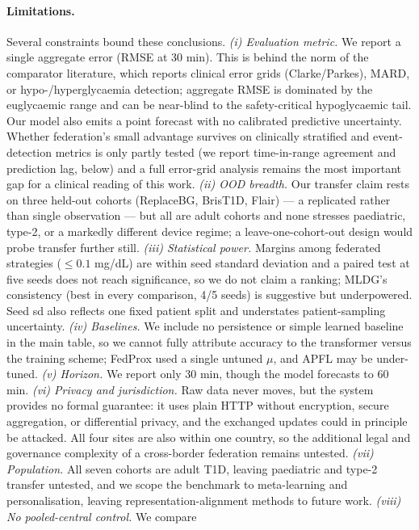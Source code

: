 \documentclass[10pt,letterpaper]{article}
\begin{document}
\paragraph{Limitations.} Several constraints bound these conclusions. \emph{(i)
Evaluation metric.} We report a single aggregate error (RMSE at 30 min). This is
behind the norm of the comparator literature, which reports clinical error grids
(Clarke/Parkes), MARD, or hypo-/hyperglycaemia detection; aggregate RMSE is
dominated by the euglycaemic range and can be near-blind to the safety-critical
hypoglycaemic tail. Our model also emits a point forecast with no calibrated
predictive uncertainty. Whether federation's small advantage survives on
clinically stratified and event-detection metrics is only partly tested (we
report time-in-range agreement and prediction lag, below) and a full error-grid
analysis remains the most important gap for a clinical reading of this work.
\emph{(ii) OOD breadth.} Our transfer claim rests on three held-out cohorts
(ReplaceBG, BrisT1D, Flair) --- a replicated rather than single observation ---
but all are adult cohorts and none stresses paediatric, type-2, or a markedly
different device regime; a leave-one-cohort-out design would probe transfer
further still. \emph{(iii) Statistical power.} Margins among federated strategies
($\le 0.1$ mg/dL) are within seed standard deviation and a paired test at five
seeds does not reach significance, so we do not claim a ranking; MLDG's
consistency (best in every comparison, 4/5 seeds) is suggestive but underpowered.
Seed sd also reflects one fixed patient split and understates patient-sampling
uncertainty. \emph{(iv) Baselines.} We include no persistence or
simple learned baseline in the main table, so we cannot fully attribute accuracy
to the transformer versus the training scheme; FedProx used a single untuned
$\mu$, and APFL may be under-tuned. \emph{(v) Horizon.} We report only 30 min,
though the model forecasts to 60 min. \emph{(vi) Privacy and jurisdiction.} Raw data never moves, but the system
provides no formal guarantee: it uses plain HTTP without encryption, secure
aggregation, or differential privacy, and the exchanged updates could in principle
be attacked. All four sites are also within one country, so the additional legal
and governance complexity of a cross-border federation remains untested. \emph{(vii) Population.} All seven cohorts
are adult T1D, leaving paediatric and type-2 transfer untested, and we scope the
benchmark to meta-learning and personalisation, leaving representation-alignment
methods to future work. \emph{(viii) No pooled-central control.} We compare
\end{document}
